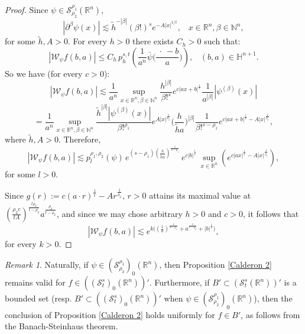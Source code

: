 \documentclass[reqno,12pt]{amsart}
\theoremstyle{plain}
\theoremstyle{definition}
\theoremstyle{remark}
\newtheorem{remark}{Remark}
\begin{document}
\begin{proof}
Since $ \psi \in {\mathcal S}^{{\rho_1}}_{{\rho_2}} (\mathbb{R}^n)$,
$$
| \partial^\beta \psi (x) | \lesssim \tilde h^{-|\beta|}( \beta ! )^{s}
e^{-A |x|^{1/t}}, \;\;\; x \in \mathbb{R}^n, \beta\in \mathbb{N}^n,
$$
for some $\tilde{h},A > 0$. For every $ h > 0 $ there exists $ C_h > 0 $ such
that:
$$
|{\mathcal W}_{\psi} f(b, a)| \leq C_h \, p^{s, t}_h
\left(\frac{1}{a^n} \bar{\psi} \Big(\frac{\: \cdot \: - b}{a}\Big)\right),
\;\;\; (b,a) \in \mathbb{H}^{n+1}.
$$
So we have (for every $c>0$):
$$
|{\mathcal W}_{\psi} f(b, a)| \lesssim \frac{1}{a^n} \sup_{x \in
\mathbb{R}^n, \beta \in \mathbb{N}^n} \frac{h^{|\beta|}}{\beta!^s}
e^{c |ax + b|^{\frac{1}{t}}} \frac{1}{a^{|\beta|}}
|\psi^{(\beta)} (x)|
$$
$$
= \frac{1}{a^n} \sup_{x \in \mathbb{R}^n, \beta \in \mathbb{N}^n}
\frac{\tilde h^{|\beta|} |\psi^{(\beta)} (x)|}{\beta!^{{\rho_1}}}
e^{A |x|^{\frac{1}{{\rho_2}}}} \Big(\frac{h}{\tilde h a}\Big)^{|\beta|}
\frac{1}{\beta!^{s - {\rho_1}}} e^{c |ax + b|^{\frac{1}{t}} - A
|x|^{\frac{1}{{\rho_2}}}},
$$
where $\tilde h, A > 0$. Therefore,
$$
|{\mathcal W}_{\psi} f(b, a)| \lesssim
 p^{{\rho_1}, {\rho_2}}_{l} (\psi) \,
 e^{(s-{\rho_1}) (\frac{h}{\tilde h a})^{\frac{1}{s - {\rho_1} }}} \,
 e^{c |b|^{\frac{1}{t}}}
\, \sup_{x \in \mathbb{R}^n} (e^{c |ax|^{\frac{1}{t}} - A
|x|^{\frac{1}{{\rho_2}}}}),
$$
for some $l>0$.

Since $ g(r) := c ( a \cdot r)^{\frac{1}{t}} - A r^{\frac{1}{{\rho_2}}},
\, r > 0 $ attains its  maximal value at $ (\frac{{\rho_2} c}{t
A})^{\frac{t {\rho_2}}{t - {\rho_2}}} a^{\frac{{\rho_2}}{t - {\rho_2}}} $, and since we
may chose arbitrary $h>0$ and $c>0$, it follows that
$$
|{\mathcal W}_{\psi} f(b, a)| \lesssim e^{k
\big((\frac{1}{a})^{\frac{1}{s - {\rho_1} }} + a^{\frac{1}{t - {\rho_2}}} +
|b|^{\frac{1}{t}}  \big)},
$$
for every $k>0$.
\end{proof}

\par

\begin{remark}
\label{remark bounded}
Naturally, if $\psi\in (\mathcal{S}_{\rho_2}^{\rho_1})_{0}(\mathbb{R}^{n})$, then Proposition \ref{Calderon 2} remains valid for  $f\in ((\mathcal{S}_{t}^{s})_{0}(\mathbb{R}^{n}))'$. Furthermore,
if $B'\subset (\mathcal{S}_{t}^{s}(\mathbb{R}^{n}))'$ is a bounded set (resp. $B'\subset ((\mathcal{S}_{t}^{s})_{0}(\mathbb{R}^{n}))'$ when $\psi\in (\mathcal{S}_{\rho_2}^{\rho_1})_{0}(\mathbb{R}^{n})$), then the conclusion of Proposition \ref{Calderon 2} holds uniformly for $f\in B'$, as follows from
the Banach-Steinhaus theorem.
\end{remark}
\end{document}
